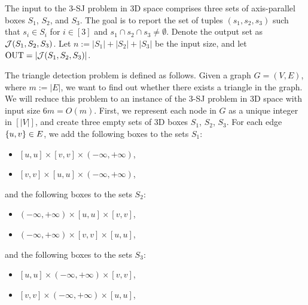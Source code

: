 The input to the 3-SJ problem in 3D space comprises
 three sets of axis-parallel boxes $S_1$, $S_2$, and $S_3$. 
The goal is to report the set of tuples $(s_1,s_2,s_3)$ such that $s_i \in S_i$ for $i \in [3]$ and $s_1 \cap s_2 \cap s_3 \neq \emptyset$. Denote the output set as $\mathcal{J}(S_1,S_2,S_3)$.
Let $n:=|S_1|+|S_2|+|S_3|$ be the input size, and let $\mathrm{OUT} = |\mathcal{J}(S_1,S_2,S_3)|$.

The triangle detection problem is defined as follows. Given a graph $G = (V,E)$, where $m:=|E|$, we want to find out whether there exists a triangle in the graph. We will reduce this problem to an instance of the 3-SJ problem in 3D space with input size $6m=O(m)$. First, we represent each node in $G$ as a unique integer in $[|V|]$, and create three empty sets of 3D boxes $S_1$, $S_2$, $S_3$. For each edge $\{u,v\}\in E$, we add the following boxes to the sets $S_1$:
\begin{itemize}
    \item $[u,u]\times [v,v]\times(-\infty,+\infty)$,
    \item $[v,v]\times [u,u] \times (-\infty,+\infty)$,
\end{itemize}
and the following boxes to the sets $S_2$:
\begin{itemize}
    \item $(-\infty,+\infty)\times[u,u]\times [v,v]$,
    \item $(-\infty,+\infty) \times[v,v]\times [u,u]$,
\end{itemize}
and the following boxes to the sets $S_3$:
\begin{itemize}
    \item $[u,u]\times(-\infty,+\infty)\times [v,v]$,
    \item $[v,v]\times(-\infty,+\infty)\times [u,u]$,
\end{itemize}

